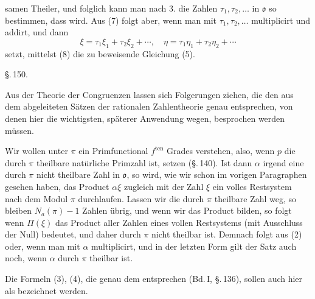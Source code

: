 samen Theiler, und folglich kann man nach 3. die Zahlen $\tau_1,
\tau_2, \ldots$ in $\mathfrak{o}$ so bestimmen, dass
wird. Aus (7) folgt aber, wenn man mit $\tau_1, \tau_2, \ldots$
multiplicirt und addirt, und dann
\[
\xi = \tau_1\xi_1 + \tau_2\xi_2 + \cdots, \quad
\eta = \tau_1\eta_1 + \tau_2\eta_2 + \cdots
\]
setzt, mittelst (8) die zu beweisende Gleichung (5).

\begin{center}
\S.\,150.

\end{center}

Aus der Theorie der Congruenzen lassen sich Folgerungen ziehen, die den
aus dem  abgeleiteten Sätzen der
rationalen Zahlentheorie genau entsprechen, von denen hier die
wichtigsten, späterer Anwendung wegen, besprochen werden müssen.

Wir wollen unter $\pi$ ein Primfunctional $f^{\mathrm{ten}}$ Grades
verstehen, also, wenn $p$ die durch $\pi$ theilbare natürliche
Primzahl ist,
setzen (\S.\,140). Ist dann $\alpha$ irgend eine durch $\pi$ nicht
theilbare Zahl in $\mathfrak{o}$, so wird, wie wir schon im vorigen
Paragraphen gesehen haben, das Product $\alpha\xi$ zugleich mit der
Zahl $\xi$ ein volles Restsystem nach dem Modul $\pi$ durchlaufen.
Lassen wir die durch $\pi$ theilbare Zahl weg, so bleiben $N_a(\pi) - 1$
Zahlen übrig, und wenn wir das Product bilden, so folgt
wenn $\Pi(\xi)$ das Product aller Zahlen eines vollen Restsystems (mit
Ausschluss der Null) bedeutet, und daher durch $\pi$ nicht theilbar
ist. Demnach folgt aus (2)
oder, wenn man mit $\alpha$ multiplicirt,
und in der letzten Form gilt der Satz auch noch, wenn $\alpha$ durch
$\pi$ theilbar ist.

Die Formeln (3), (4), die genau dem 
entsprechen (Bd.\,I, \S.\,136), sollen auch hier als  bezeichnet werden.
